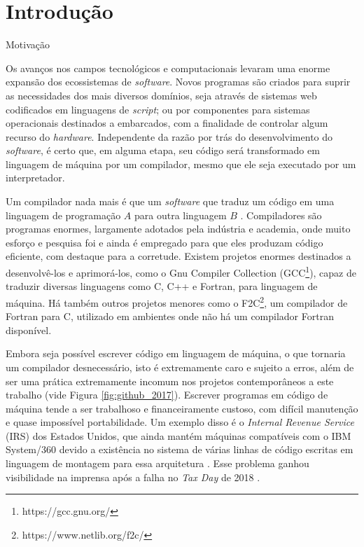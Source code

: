 \chapter{Introdução}
\label{cap:introducao}

\begin{section}{Motivação}

Os avanços nos campos tecnológicos e computacionais levaram uma enorme expansão
dos ecossistemas de \textit{software}. Novos programas são criados para
suprir as necessidades dos mais diversos domínios, seja através de sistemas web
codificados em linguagens de \textit{script}; ou por componentes para
sistemas operacionais destinados a embarcados, com a finalidade de controlar algum
recurso do \textit{hardware}. Independente da razão por trás do desenvolvimento
do \textit{software}, é certo que, em alguma etapa, seu código será transformado em linguagem
de máquina por um compilador, mesmo que ele seja executado por um
interpretador.

Um compilador nada mais é que um \textit{software} que traduz um código em uma linguagem
de programação $A$ para outra linguagem $B$ \citep{dragonbook}.  Compiladores
são programas enormes, largamente adotados pela indústria e academia, onde muito
esforço e pesquisa foi e ainda é empregado para que eles produzam código
eficiente, com destaque para a corretude. Existem projetos enormes destinados a desenvolvê-los e
aprimorá-los, como o Gnu Compiler Collection
(GCC\footnote{https://gcc.gnu.org/}), capaz de traduzir diversas linguagens
como C, C++ e Fortran, para linguagem de máquina. Há também outros projetos
menores como o F2C\footnote{https://www.netlib.org/f2c/}, um compilador de
Fortran para C, utilizado em ambientes onde não há um compilador Fortran
disponível.

Embora seja possível escrever código em linguagem de máquina, o que
tornaria um compilador desnecessário, isto é extremamente caro e
sujeito a erros, além de ser uma prática extremamente
incomum nos projetos contemporâneos a este trabalho \citep{githuboctoverse} (vide
Figura \ref{fig:github_2017}). Escrever programas em código de máquina tende a
ser trabalhoso e financeiramente custoso, com difícil manutenção e quase impossível portabilidade.
Um exemplo disso é o \textit{Internal Revenue Service} (IRS) dos Estados Unidos,
que ainda mantém máquinas compatíveis com o IBM System/360 devido a existência no sistema
de várias linhas de código escritas em linguagem de montagem para essa
arquitetura \citep{gao}. Esse problema ganhou visibilidade na imprensa após a falha no
\textit{Tax Day} de 2018 \citep{tax_failure}.


\end{section}
